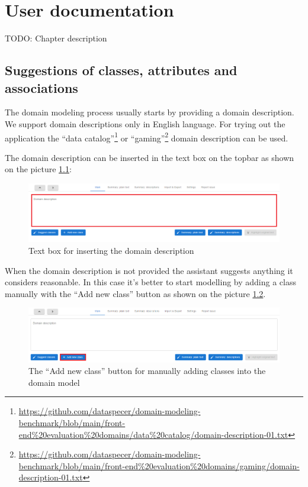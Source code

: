\chapter{User documentation}

TODO: Chapter description

\section{Suggestions of classes, attributes and associations}
The domain modeling process usually starts by providing a domain description. We support domain descriptions only in English language. For trying out the application the ``data catalog''\footnote{\url{https://github.com/dataspecer/domain-modeling-benchmark/blob/main/front-end\%20evaluation\%20domains/data\%20catalog/domain-description-01.txt}} or ``gaming''\footnote{\url{https://github.com/dataspecer/domain-modeling-benchmark/blob/main/front-end\%20evaluation\%20domains/gaming/domain-description-01.txt}} domain description can be used.

The domain description can be inserted in the text box on the topbar as shown on the picture \ref{fig:domain-description-text-box}:

\begin{figure}[!h]
    \includegraphics[scale=0.35]{../docs/images/frontend/insert-domain-description.png}
    \caption{\centering Text box for inserting the domain description}
    \label{fig:domain-description-text-box}
\end{figure}

When the domain description is not provided the assistant suggests anything it considers reasonable. In this case it's better to start modelling by adding a class manually with the ``Add new class'' button as shown on the picture \ref{fig:add_new_class}.

\begin{figure}[!h]
    \includegraphics[scale=0.36]{../docs/images/frontend/add-new-class-manually.png}
    \caption{\centering The ``Add new class'' button for manually adding classes into the domain model}
    \label{fig:add_new_class}
\end{figure}

